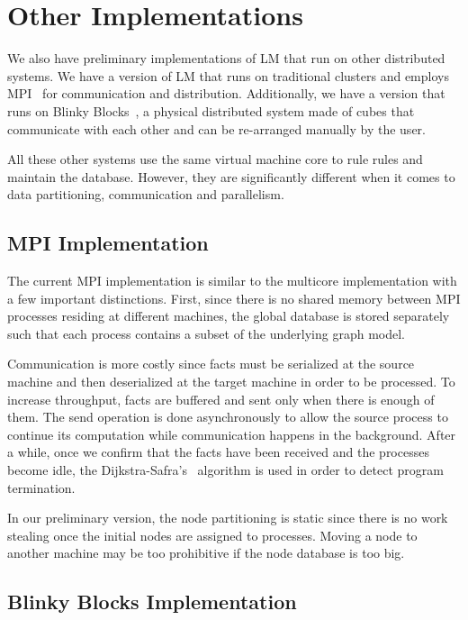 \section{Other Implementations}

We also have preliminary implementations of LM that run on other distributed systems.
We have a version of LM that runs on traditional clusters and employs MPI~\cite{gabriel04-open-mpi} for communication
and distribution. Additionally, we have a version that runs on Blinky Blocks~\cite{Kirby-chi11}, a physical distributed system
made of cubes that communicate with each other and can be re-arranged manually by the user.

All these other systems use the same virtual machine core to rule rules and maintain the database. However, they are significantly different
when it comes to data partitioning, communication and parallelism.

\subsection{MPI Implementation}

The current MPI implementation is similar to the multicore implementation with a few important distinctions. First, since there is no shared
memory between MPI processes residing at different machines, the global database is stored separately such that each process contains a subset
of the underlying graph model.

Communication is more costly since facts must be serialized at the source machine and then deserialized
at the target machine in order to be processed. To increase throughput, facts are buffered and sent only when there is enough of them.
The send operation is done asynchronously to allow the source process to continue its computation while communication happens in the background.
After a while, once we confirm that the facts have been received and the processes become idle, the Dijkstra-Safra's~\cite{safras87} algorithm
is used in order to detect program termination.

In our preliminary version, the node partitioning is static since there is no work stealing once the initial nodes are assigned to processes.
Moving a node to another machine may be too prohibitive if the node database is too big.
 
\subsection{Blinky Blocks Implementation}

